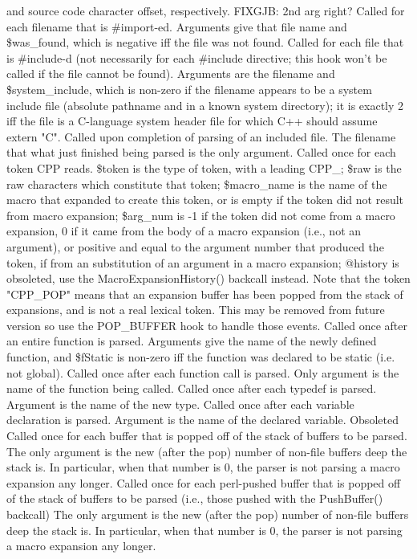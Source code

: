 and source code character offset, respectively.
 FIXGJB: 2nd arg right?
Called for each filename that is \#import-ed.  Arguments give that
file name and \$was\_\-found, which is negative iff the file was not found.
Called for each file that is \#include-d (not necessarily for each \#include
directive; this hook won't be called if the file cannot be found).
Arguments are the filename and \$system\_\-include, which is non-zero if the filename
appears to be a system include file (absolute pathname and in a known
system directory);  it is exactly 2 iff the file is a C-language
system header file for which C++ should assume extern "C".
Called upon completion of parsing of an included file.  The filename
that what just finished being parsed is the only argument.
Called once for each token CPP reads.  \$token is the type of token,
with a leading CPP\_\-; \$raw is the raw characters which constitute that
token; \$macro\_\-name is the name of the macro that expanded to create this token,
or is empty if the token did not result from macro expansion; \$arg\_\-num is -1
if the token did not come from a macro expansion, 0 if it came from the
body of a macro expansion (i.e., not an argument), or positive and equal
to the argument number that produced the token, if from an substitution
of an argument in a macro expansion; @history is obsoleted, use the
MacroExpansionHistory() backcall instead.  Note that the token "CPP\_\-POP"
means that an expansion buffer has been popped from the stack of expansions,
and is not a real lexical token.  This may be removed from future version
so use the POP\_\-BUFFER hook to handle those events.
Called once after an entire function is parsed.  Arguments
give the name of the newly defined function, and \$fStatic is non-zero
iff the function was declared to be static (i.e. not global).
Called once after each function call is parsed.  Only argument is
the name of the function being called.
Called once after each typedef is parsed.  Argument is the name
of the new type.
Called once after each variable declaration is parsed.  Argument is the name
of the declared variable.
 Obsoleted
Called once for each buffer that is popped off of the stack of
buffers to be parsed. The only argument is the new (after the pop)
number of non-file buffers
deep the stack is.  In particular, when that number is 0, 
the parser is not parsing a macro expansion any longer.
Called once for each perl-pushed buffer that is popped off of the stack of
buffers to be parsed (i.e., those pushed with the PushBuffer() backcall)
The only argument is the new (after the pop)
number of non-file buffers
deep the stack is.  In particular, when that number is 0, 
the parser is not parsing a macro expansion any longer.
